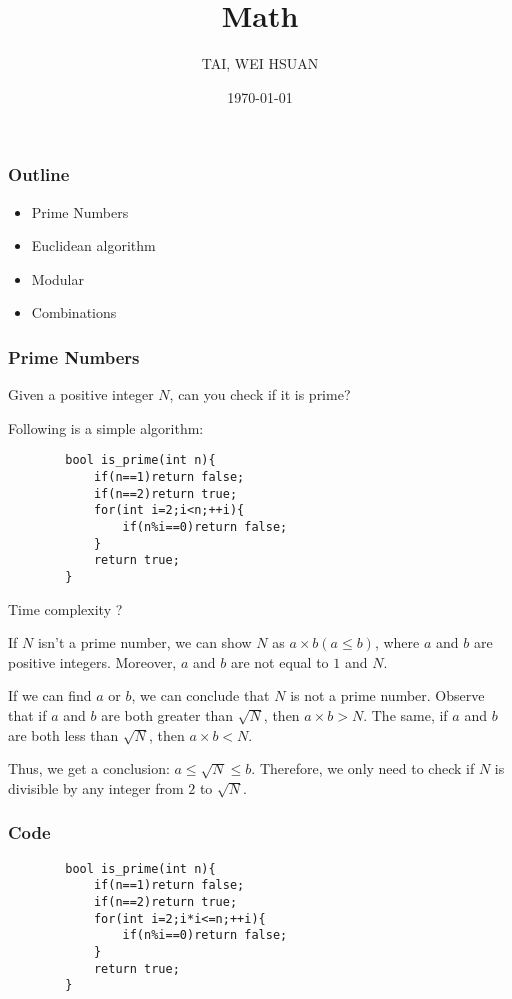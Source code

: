 \documentclass[xcolor=dvipsnames]{beamer}
\title{Math}
\author{TAI, WEI HSUAN}
\date{\today}
\begin{document}
	
	\begin{frame}
		\titlepage
	\end{frame}
	
	\begin{frame}
		\frametitle{Outline}
        \begin{itemize}
            \item Prime Numbers
            \item Euclidean algorithm
            \item Modular
            \item Combinations
            
        \end{itemize}
	\end{frame}

    \begin{frame}[fragile]
        \frametitle{Prime Numbers}
        Given a positive integer $N$, can you check if it is prime?

        Following is a simple algorithm:
        \begin{verbatim}
        bool is_prime(int n){
            if(n==1)return false;
            if(n==2)return true;
            for(int i=2;i<n;++i){
                if(n%i==0)return false;
            }
            return true;
        }            
        \end{verbatim}
        Time complexity ?
    \end{frame}

    \begin{frame}[fragile]
        If $N$ isn't a prime number, we can show $N$ as $a\times b(a\le b)$, where $a$ and $b$ are positive integers. Moreover, $a$ and $b$ are not equal to $1$ and $N$.

        If we can find $a$ or $b$, we can conclude that $N$ is not a prime number. Observe that if $a$ and $b$ are both greater than $\sqrt{N}$, then $a \times b > N$. The same, if $a$ and $b$ are both less than $\sqrt{N}$, then $a \times b < N$. 
        
        Thus, we get a conclusion: $a\le \sqrt{N}\le b$. Therefore, we only need to check if $N$ is divisible by any integer from $2$ to $\sqrt{N}$.
    \end{frame}

    \begin{frame}[fragile]
        \frametitle{Code}
        
        \begin{verbatim}
        bool is_prime(int n){
            if(n==1)return false;
            if(n==2)return true;
            for(int i=2;i*i<=n;++i){
                if(n%i==0)return false;
            }
            return true;
        }            
        \end{verbatim}
    \end{frame}
    
\end{document}
